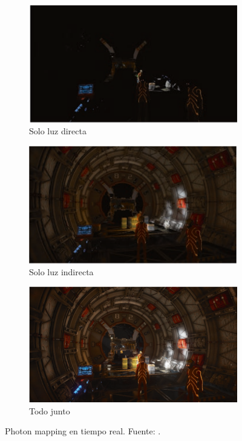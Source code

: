 \begin{figure}
    \begin{subfigure}{.5\textwidth}
        \centering
        \includegraphics[width=\textwidth]{real-time-photon-mapping-direct-only.png}
        \caption{Solo luz directa}
    \end{subfigure}
    \begin{subfigure}{.5\textwidth}
        \centering
        \includegraphics[width=\textwidth]{real-time-photon-mapping-indirect-only.png}
        \caption{Solo luz indirecta}
    \end{subfigure}
    \begin{subfigure}{\textwidth}
        \centering
        \includegraphics[width=\textwidth]{real-time-photon-mapping.png}
        \caption{Todo junto}
    \end{subfigure}
    \caption{Photon mapping en tiempo real. Fuente: \cite{real-time-photon-mapping}.}
    \label{fig:real-time-photon-mapping}
\end{figure}


